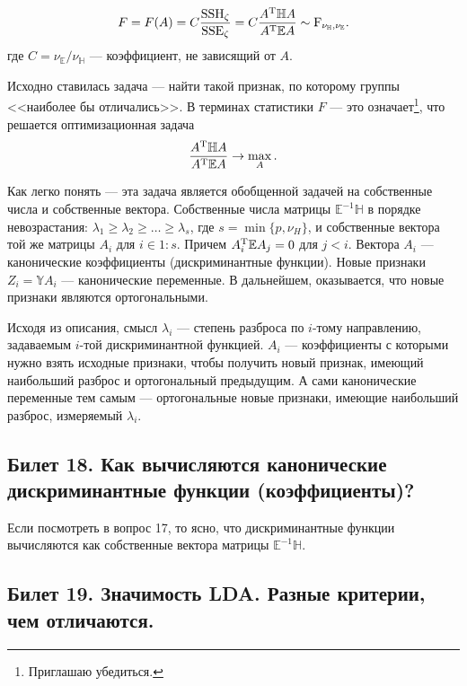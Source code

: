 \begin{gather*}
    F = F(A) = C \frac{\mathrm{SSH}_\zeta}{\mathrm{SSE_\zeta}} = C \frac{A^{\mathrm{T}} \mathbb H A}{A^{\mathrm{T}} \mathbb E A} \sim
    \mathrm F_{\nu_\mathbb H, \nu_\mathbb E}.
\end{gather*}
где $C = \nu_\mathbb E / \nu_\mathbb H$ --- коэффициент, не зависящий от $A$.

Исходно ставилась задача --- найти такой признак, по которому группы <<наиболее бы отличались>>.
В терминах статистики $F$ --- это означает\footnote{Приглашаю убедиться.}, что решается оптимизационная задача
\begin{gather*}
    \frac{A^{\mathrm{T}} \mathbb H A}{A^{\mathrm{T}} \mathbb E A} \rightarrow \max_A.
\end{gather*}

Как легко понять --- эта задача является обобщенной задачей на собственные числа и собственные вектора.
Собственные числа матрицы $\mathbb E^{-1} \mathbb H$ в порядке невозрастания: $\lambda_1 \geqslant \lambda_2 \geqslant \ldots
\geqslant \lambda_s$, где $s = \min\{p, \nu_H\}$, и собственные вектора той же матрицы $A_i$ для $i \in 1:s$.
Причем $A_i^{\mathrm{T}} \mathbb E A_j = 0$ для $j < i$.
Вектора $A_i$ --- канонические коэффициенты (дискриминантные функции). Новые признаки $Z_i = \mathbb Y A_i$ --- канонические переменные.
В дальнейшем, оказывается, что новые признаки являются ортогональными.

Исходя из описания, смысл $\lambda_i$ --- степень разброса по $i$-тому направлению, задаваемым $i$-той дискриминантной функцией.
$A_i$ --- коэффициенты с которыми нужно взять исходные признаки, чтобы получить новый признак, имеющий наибольший разброс и ортогональный
предыдущим. А сами канонические переменные тем самым --- ортогональные новые признаки, имеющие наибольший разброс, измеряемый $\lambda_i$.

\subsection{Билет 18. Как вычисляются канонические дискриминантные функции (коэффициенты)?}

Если посмотреть в вопрос 17, то ясно, что дискриминантные функции вычисляются как собственные вектора матрицы $\mathbb E^{-1} \mathbb H$.

\subsection{Билет 19. Значимость LDA. Разные критерии, чем отличаются.}

